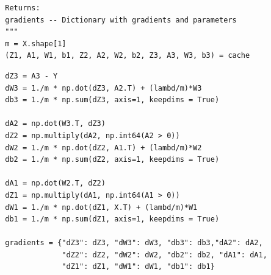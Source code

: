 \documentclass[11pt, a4paper]{article}
\begin{document}
\begin{spacing}{1.1}
\begin{lstlisting}
		Returns:
		gradients -- Dictionary with gradients and parameters
		"""
		m = X.shape[1]
		(Z1, A1, W1, b1, Z2, A2, W2, b2, Z3, A3, W3, b3) = cache \end{lstlisting} \newpage
		
	\begin{lstlisting}
		dZ3 = A3 - Y
		dW3 = 1./m * np.dot(dZ3, A2.T) + (lambd/m)*W3
		db3 = 1./m * np.sum(dZ3, axis=1, keepdims = True)
		
		dA2 = np.dot(W3.T, dZ3)
		dZ2 = np.multiply(dA2, np.int64(A2 > 0))
		dW2 = 1./m * np.dot(dZ2, A1.T) + (lambd/m)*W2
		db2 = 1./m * np.sum(dZ2, axis=1, keepdims = True)
		
		dA1 = np.dot(W2.T, dZ2)
		dZ1 = np.multiply(dA1, np.int64(A1 > 0))
		dW1 = 1./m * np.dot(dZ1, X.T) + (lambd/m)*W1
		db1 = 1./m * np.sum(dZ1, axis=1, keepdims = True)
		
		gradients = {"dZ3": dZ3, "dW3": dW3, "db3": db3,"dA2": dA2,
		             "dZ2": dZ2, "dW2": dW2, "db2": db2, "dA1": dA1, 
		             "dZ1": dZ1, "dW1": dW1, "db1": db1}
		

\end{lstlisting}
\end{spacing}
\end{document}
